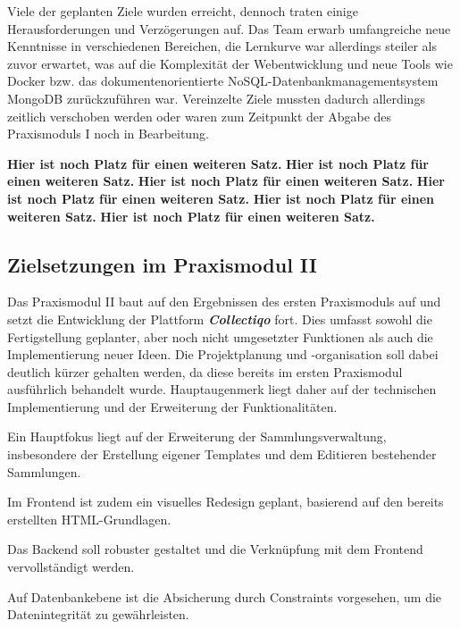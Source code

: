 Viele der geplanten Ziele wurden erreicht, dennoch traten einige Herausforderungen und Verzögerungen auf.
Das Team erwarb umfangreiche neue Kenntnisse in verschiedenen Bereichen, die Lernkurve war allerdings steiler als zuvor erwartet, was auf die Komplexität der Webentwicklung und neue Tools wie Docker bzw. das dokumentenorientierte NoSQL-Datenbankmanagementsystem MongoDB zurückzuführen war.
Vereinzelte Ziele mussten dadurch allerdings zeitlich verschoben werden oder waren zum Zeitpunkt der Abgabe des Praxismoduls I noch in Bearbeitung.

\textbf{Hier ist noch Platz für einen weiteren Satz.}
\textbf{Hier ist noch Platz für einen weiteren Satz.}
\textbf{Hier ist noch Platz für einen weiteren Satz.}
\textbf{Hier ist noch Platz für einen weiteren Satz.}
\textbf{Hier ist noch Platz für einen weiteren Satz.}
\textbf{Hier ist noch Platz für einen weiteren Satz.}
\newpage

\subsection{Zielsetzungen im Praxismodul II}\label{subsec:subsection-one-two}

Das Praxismodul II baut auf den Ergebnissen des ersten Praxismoduls auf und setzt die Entwicklung der Plattform \textbf{\textit{Collectiqo}} fort.
Dies umfasst sowohl die Fertigstellung geplanter, aber noch nicht umgesetzter Funktionen als auch die Implementierung neuer Ideen.
Die Projektplanung und -organisation soll dabei deutlich kürzer gehalten werden, da diese bereits im ersten Praxismodul ausführlich behandelt wurde.
Hauptaugenmerk liegt daher auf der technischen Implementierung und der Erweiterung der Funktionalitäten.


Ein Hauptfokus liegt auf der Erweiterung der Sammlungsverwaltung, insbesondere der Erstellung eigener Templates und dem Editieren bestehender Sammlungen.

Im Frontend ist zudem ein visuelles Redesign geplant, basierend auf den bereits erstellten HTML-Grundlagen.

Das Backend soll robuster gestaltet und die Verknüpfung mit dem Frontend vervollständigt werden.

Auf Datenbankebene ist die Absicherung durch Constraints vorgesehen, um die Datenintegrität zu gewährleisten.

